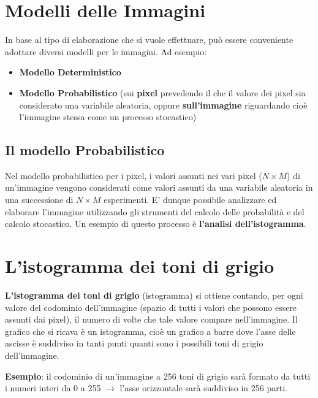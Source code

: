 \section{Modelli delle Immagini}
In base al tipo di elaborazione che si vuole effettuare, può essere conveniente adottare diversi modelli per le immagini. Ad esempio:

\begin{itemize}
    \item \textbf{Modello Deterministico}
    \item \textbf{Modello Probabilistico} (sui \textbf{pixel} prevedendo il che il valore dei pixel sia considerato una variabile aleatoria,
          oppure \textbf{sull'immagine} riguardando cioè l'immagine stessa come un processo stocastico)
\end{itemize}

\subsection{Il modello Probabilistico}

Nel modello probabilistico per i pixel, i valori assunti nei vari pixel ($N × M$) di un'immagine vengono considerati come valori assunti
da una variabile aleatoria in una successione di $N × M$ esperimenti. E' dunque possibile analizzare ed elaborare l'immagine utilizzando gli strumenti del calcolo delle probabilità e del calcolo stocastico.
Un esempio di questo processo è \textbf{l'analisi dell'istogramma}.

\section{L'istogramma dei toni di grigio}

\textbf{L'istogramma dei toni di grigio} (istogramma) si ottiene contando, per ogni valore del codominio dell'immagine (spazio di tutti i valori
che possono essere assunti dai pixel), il numero di volte che tale valore compare nell'immagine.
Il grafico che si ricava è un istogramma, cioè un grafico a barre dove l'asse delle ascisse è suddiviso in tanti punti quanti sono i
possibili toni di grigio dell'immagine.

\begin{trivlist}
    \item \textbf{Esempio}: il codominio di un'immagine a 256 toni di grigio sarà formato da tutti i numeri interi da 0 a 255 $\rightarrow$ l'asse orizzontale sarà suddiviso in 256 parti.
\end{trivlist}


